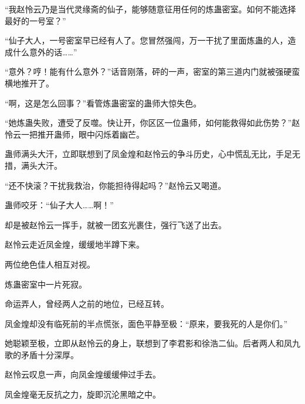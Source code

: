 \begin{this_body}
“我赵怜云乃是当代灵缘斋的仙子，能够随意征用任何的炼蛊密室。如何不能选择最好的一号室？”

“仙子大人，一号密室早已经有人了。您冒然强闯，万一干扰了里面炼蛊的人，造成什么意外的话……”

“意外？哼！能有什么意外？”话音刚落，砰的一声，密室的第三道内门就被强硬蛮横地推开了。

“啊，这是怎么回事？”看管炼蛊密室的蛊师大惊失色。

“她炼蛊失败，遭受了反噬。快让开，你区区一位蛊师，如何能救得如此伤势？”赵怜云一把推开蛊师，眼中闪烁着幽芒。

蛊师满头大汗，立即联想到了凤金煌和赵怜云的争斗历史，心中慌乱无比，手足无措，满头大汗。

“还不快滚？干扰我救治，你能担待得起吗？”赵怜云又喝道。

蛊师咬牙：“仙子大人……啊！”

却是被赵怜云一挥手，就被一团玄光裹住，强行飞送了出去。

赵怜云走近凤金煌，缓缓地半蹲下来。

两位绝色佳人相互对视。

炼蛊密室中一片死寂。

命运弄人，曾经两人之前的地位，已经互转。

凤金煌却没有临死前的半点慌张，面色平静至极：“原来，要我死的人是你们。”

她聪颖至极，立即从赵怜云的身上，联想到了李君影和徐浩二仙。后者两人和凤九歌的矛盾十分深厚。

赵怜云叹息一声，向凤金煌缓缓伸过手去。

凤金煌毫无反抗之力，旋即沉沦黑暗之中。

\end{this_body}

